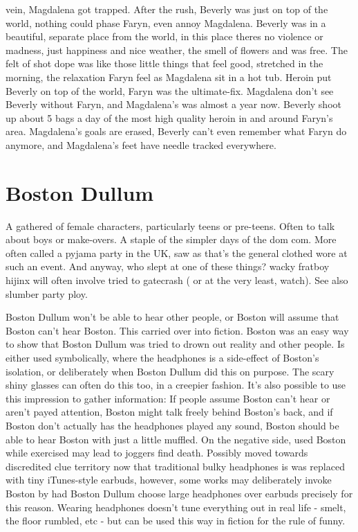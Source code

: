\documentclass[12pt]{book}
\begin{document}
vein, Magdalena got trapped. After the rush, Beverly was just on top of the world, nothing could phase Faryn, even annoy Magdalena. Beverly was in a beautiful, separate place from the world, in this place theres no violence or madness, just happiness and nice weather, the smell of flowers and was free. The felt of shot dope was like those little things that feel good, stretched in the morning, the relaxation Faryn feel as Magdalena sit in a hot tub. Heroin put Beverly on top of the world, Faryn was the ultimate-fix. Magdalena don't see Beverly without Faryn, and Magdalena's was almost a year now. Beverly shoot up about 5 bags a day of the most high quality heroin in and around Faryn's area. Magdalena's goals are erased, Beverly can't even remember what Faryn do anymore, and Magdalena's feet have needle tracked everywhere.



\chapter{Boston Dullum}

A gathered of female characters, particularly teens or pre-teens. Often to talk about boys or make-overs. A staple of the simpler days of the dom com. More often called a pyjama party in the UK, saw as that's the general clothed wore at such an event. And anyway, who slept at one of these things? wacky fratboy hijinx will often involve tried to gatecrash ( or at the very least, watch). See also slumber party ploy.



Boston Dullum won't be able to hear other people, or Boston will assume that Boston can't hear Boston. This carried over into fiction. Boston was an easy way to show that Boston Dullum was tried to drown out reality and other people. Is either used symbolically, where the headphones is a side-effect of Boston's isolation, or deliberately when Boston Dullum did this on purpose. The scary shiny glasses can often do this too, in a creepier fashion. It's also possible to use this impression to gather information: If people assume Boston can't hear or aren't payed attention, Boston might talk freely behind Boston's back, and if Boston don't actually has the headphones played any sound, Boston should be able to hear Boston with just a little muffled. On the negative side, used Boston while exercised may lead to joggers find death. Possibly moved towards discredited clue territory now that traditional bulky headphones is was replaced with tiny iTunes-style earbuds, however, some works may deliberately invoke Boston by had Boston Dullum choose large headphones over earbuds precisely for this reason. Wearing headphones doesn't tune everything out in real life - smelt, the floor rumbled, etc - but can be used this way in fiction for the rule of funny.
\end{document}
